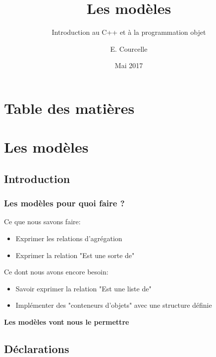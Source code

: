 \documentclass{beamer}
\title{Les modèles}
\subtitle{Introduction au C++ et à la programmation objet}
\author{E. Courcelle}\institute{CALMIP, UMS 3669}
\date{Mai 2017}
\begin{document}
\begin{frame}
\titlepage
\end{frame}

\section*{Table des matières}
\begin{frame}
\tableofcontents
\end{frame}


\section{Les modèles}

\subsection{Introduction}

\begin{frame}[fragile=singleslide,shrink=20]
\frametitle {Les modèles pour quoi faire ?}

Ce que nous savons faire:
\begin{itemize}
\item{Exprimer les relations d'agrégation}
\item{Exprimer la relation "Est une sorte de"}
\end{itemize}

Ce dont nous avons encore besoin:
\begin{itemize}
\item{Savoir exprimer la relation "Est une liste de"}
\item{Implémenter des "conteneurs d'objets" avec une structure définie}
\end{itemize}

\textbf{Les modèles vont nous le permettre}
\end{frame}

\subsection{Déclarations}
\end{document}
